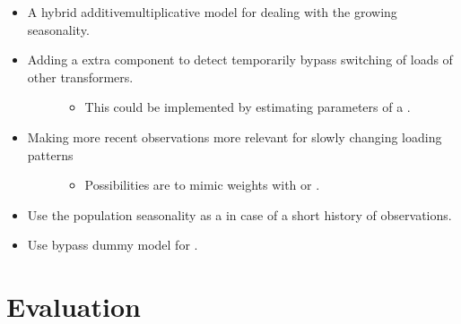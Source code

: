 \documentclass[letterpaper,10pt,english]{sphinxmanual}
\begin{document}
\begin{itemize}
\item {} 
A hybrid additive\sphinxhyphen{}multiplicative model for dealing with the growing seasonality.

\item {} \begin{description}
\item[{Adding a extra component to detect temporarily bypass switching of loads of other transformers.}] \leavevmode\begin{itemize}
\item {} 
This could be implemented by estimating parameters of a .

\end{itemize}

\end{description}

\item {} \begin{description}
\item[{Making more recent observations more relevant for slowly changing loading patterns}] \leavevmode\begin{itemize}
\item {} 
Possibilities are to mimic weights with  or .

\end{itemize}

\end{description}

\item {} 
Use the population seasonality as a  in case of a short history of observations.

\item {} 
Use by\sphinxhyphen{}pass dummy model for .

\end{itemize}


\chapter{Evaluation}
\label{\detokenize{evaluation:evaluation}}\label{\detokenize{evaluation::doc}}
\end{document}
